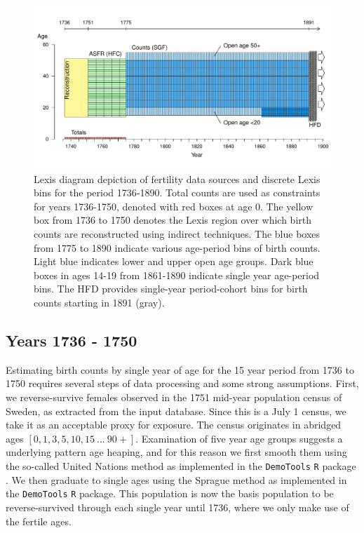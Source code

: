 \begin{figure}[ht!]
\begin{center}
\includegraphics[scale=.65]{Figures/HistoricalDimensions.pdf}
\vspace{-2em}
\caption{Lexis diagram depiction of fertility data sources and discrete Lexis bins for the period 1736-1890. Total counts are used as constraints for years 1736-1750, denoted with red boxes at age 0. The yellow box from 1736 to 1750 denotes the Lexis region over which birth counts are reconstructed using indirect techniques. The blue boxes from 1775 to 1890 indicate various age-period bins of birth counts. Light blue indicates lower and upper open age groups. Dark blue boxes in ages 14-19 from 1861-1890 indicate single year age-period bins. The HFD provides single-year period-cohort bins for birth counts starting in 1891 (gray).}
\label{fig:histbins}
\end{center}
\end{figure}

\FloatBarrier
\subsection{Years 1736 - 1750}
\label{app:retroject}
Estimating birth counts by single year of age for the 15 year period from 1736 to 1750 requires several steps of data processing and some strong assumptions. First, we reverse-survive  females observed in the 1751 mid-year population census of Sweden, as extracted from the \citet{HMD} input database. Since this is a July 1 census, we take it as an acceptable proxy for exposure. The census originates in abridged ages $[0,1,3,5,10,15~...~90+]$. Examination of five year age groups suggests a underlying pattern age heaping, and for this reason we first smooth them using the so-called United Nations method \citep[see ][]{carrier1959reduction} as implemented in the \texttt{DemoTools} \texttt{R} package \citep{demotools}. We then graduate to single ages using the Sprague method \citep{sprague1880explanation,Shryock1973} as implemented in the \texttt{DemoTools} \texttt{R} package. This population is now the basis population to be reverse-survived through each single year until 1736, where we only make use of the fertile ages.

